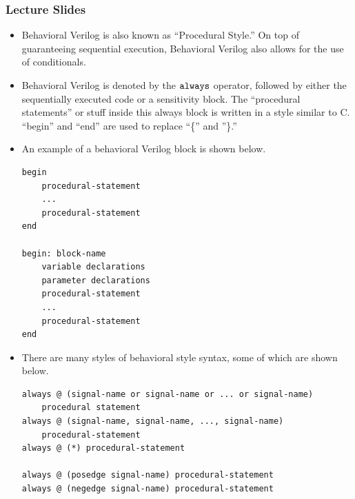 \documentclass[10pt,a4paper]{article}
\begin{document}
\subsubsection{Lecture Slides}
\begin{itemize}
\item Behavioral Verilog is also known as ``Procedural Style.'' On top of guaranteeing sequential execution, Behavioral Verilog also allows for the use of conditionals. 
\item Behavioral Verilog is denoted by the $\tt{always}$ operator, followed by either the sequentially executed code or a sensitivity block. The ``procedural statements'' or stuff inside this always block is written in a style similar to C. ``begin'' and ``end'' are used to replace ``\{'' and ''\}.''
\item An example of a behavioral Verilog block is shown below.
\begin{lstlisting}
begin
	procedural-statement
	...
	procedural-statement
end

begin: block-name
	variable declarations
	parameter declarations
	procedural-statement
	...
	procedural-statement
end
\end{lstlisting}
\item There are many styles of behavioral style syntax, some of which are shown below.
\begin{lstlisting}
always @ (signal-name or signal-name or ... or signal-name)
	procedural statement
always @ (signal-name, signal-name, ..., signal-name)
	procedural-statement
always @ (*) procedural-statement

always @ (posedge signal-name) procedural-statement
always @ (negedge signal-name) procedural-statement


\end{lstlisting}
\end{itemize}
\end{document}
